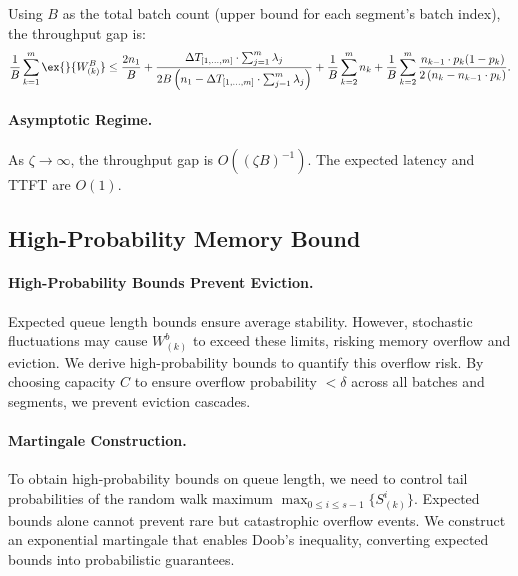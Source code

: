 Using $B$ as the total batch count (upper bound for each segment's batch index), the throughput gap is:
$$\frac{1}{B}\sum_{k=1}^m \ex{}{W^B_{(k)}}\leq
\frac{2n_1}{B} +\frac{\Delta T_{[1,\ldots,m]}\cdot \sum_{j=1}^m \lambda_j}{2B\left( n_1 - \Delta T_{[1,\ldots,m]}\cdot \sum_{j=1}^m \lambda_j\right)} +\frac{1}{B}\sum_{k=2}^m n_k +\frac{1}{B}\sum_{k=2}^m\frac{n_{k-1}\cdot p_k(1-p_k)}{2\left(n_{k}-n_{k-1}\cdot p_k\right)}.$$

\paragraph{Asymptotic Regime.} As $\zeta \to \infty$, the throughput gap is $O((\zeta B)^{-1})$. The expected latency and TTFT are $O(1)$.

\subsection{High-Probability Memory Bound}

\paragraph{High-Probability Bounds Prevent Eviction.}
Expected queue length bounds ensure average stability. However, stochastic fluctuations may cause $W^b_{(k)}$ to exceed these limits, risking memory overflow and eviction. We derive high-probability bounds to quantify this overflow risk. By choosing capacity $C$ to ensure overflow probability $< \delta$ across all batches and segments, we prevent eviction cascades.

\paragraph{Martingale Construction.}
To obtain high-probability bounds on queue length, we need to control tail probabilities of the random walk maximum $\max_{0\leq i\leq s-1}\{S^i_{(k)}\}$. Expected bounds alone cannot prevent rare but catastrophic overflow events. We construct an exponential martingale that enables Doob's inequality, converting expected bounds into probabilistic guarantees.

